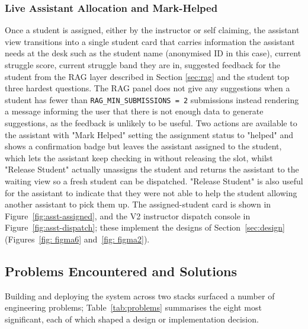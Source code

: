 
\subsubsection{Live Assistant Allocation and Mark-Helped}

Once a student is assigned, either by the instructor or self claiming, the assistant view transitions into a single student card that carries information the assistant needs at the desk such as the student name (anonymised ID in this case), current struggle score, current struggle band they are in, suggested feedback for the student from the RAG layer described in Section \ref{sec:rag} and the student top three hardest questions. 
The RAG panel does not give any suggestions when a student has fewer than \texttt{RAG\_MIN\_SUBMISSIONS = 2} submissions instead rendering a message informing the user that there is not enough data to generate suggestions, as the feedback is unlikely to be useful. 
Two actions are available to the assistant with "Mark Helped" setting the assignment status to "helped" and shows a confirmation badge but leaves the assistant assigned to the student, which lets the assistant keep checking in without releasing the slot, whilst "Release Student" actually unassigns the student and returns the assistant to the waiting view so a fresh student can be dispatched. "Release Student" is also useful for the assistant to indicate that they were not able to help the student allowing another assistant to pick them up. The assigned-student card is shown in Figure~\ref{fig:asst-assigned}, and the V2 instructor dispatch console in Figure~\ref{fig:asst-dispatch}; these implement the designs of Section~\ref{sec:design} (Figures~\ref{fig: figma6} and~\ref{fig: figma2}).






\subsection{Problems Encountered and Solutions} \label{sec:problems}


Building and deploying the system across two stacks surfaced a number of engineering problems; Table~\ref{tab:problems} summarises the eight most significant, each of which shaped a design or implementation decision.


